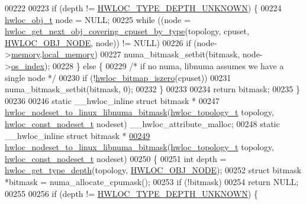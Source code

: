 \begin{DoxyCode}
00222 
00223   \textcolor{keywordflow}{if} (depth != \hyperlink{a00046_ggaf4e663cf42bbe20756b849c6293ef575a0565ab92ab72cb0cec91e23003294aad}{HWLOC_TYPE_DEPTH_UNKNOWN}) \{
00224     \hyperlink{a00016}{hwloc_obj_t} node = NULL;
00225     \textcolor{keywordflow}{while} ((node = \hyperlink{a00056_ga5915ea30f326676b3a4cfff371ce04d1}{hwloc_get_next_obj_covering_cpuset_by_type}(topology, cpuset, 
      \hyperlink{a00041_ggacd37bb612667dc437d66bfb175a8dc55aaf0964881117bdedf1a5e9332cd120dd}{HWLOC_OBJ_NODE}, node)) != NULL)
00226       \textcolor{keywordflow}{if} (node->\hyperlink{a00016_a1dc830816716213b5f797e4052487864}{memory}.\hyperlink{a00020_aace044c7f3fd9dffe50202296bf1dc5a}{local_memory})
00227         numa\_bitmask\_setbit(bitmask, node->\hyperlink{a00016_a61a7a80a68eaccbaaa28269e678c81a9}{os_index});
00228   \} \textcolor{keywordflow}{else} \{
00229     \textcolor{comment}{/* if no numa, libnuma assumes we have a single node */}
00230     \textcolor{keywordflow}{if} (!\hyperlink{a00065_gaa94fed35d2a598bc4a8657b6955b7bf5}{hwloc_bitmap_iszero}(cpuset))
00231       numa\_bitmask\_setbit(bitmask, 0);
00232   \}
00233 
00234   \textcolor{keywordflow}{return} bitmask;
00235 \}
00236 
00246 \textcolor{keyword}{static} \_\_hwloc\_inline \textcolor{keyword}{struct }bitmask *
00247 \hyperlink{a00069_gab67a395c48ddb56307b1465fab9bb9e6}{hwloc_nodeset_to_linux_libnuma_bitmask}(\hyperlink{a00039_ga9d1e76ee15a7dee158b786c30b6a6e38}{hwloc_topology_t} topology, 
      \hyperlink{a00040_ga2f5276235841ad66a79bedad16a5a10c}{hwloc_const_nodeset_t} nodeset) \_\_hwloc\_attribute\_malloc;
00248 \textcolor{keyword}{static} \_\_hwloc\_inline \textcolor{keyword}{struct }bitmask *
\hypertarget{a00034_source_l00249}{}\hyperlink{a00069_gab67a395c48ddb56307b1465fab9bb9e6}{00249} \hyperlink{a00069_gab67a395c48ddb56307b1465fab9bb9e6}{hwloc_nodeset_to_linux_libnuma_bitmask}(\hyperlink{a00039_ga9d1e76ee15a7dee158b786c30b6a6e38}{hwloc_topology_t} topology, 
      \hyperlink{a00040_ga2f5276235841ad66a79bedad16a5a10c}{hwloc_const_nodeset_t} nodeset)
00250 \{
00251   \textcolor{keywordtype}{int} depth = \hyperlink{a00046_gaea7c64dd59467f5201ba87712710b14d}{hwloc_get_type_depth}(topology, \hyperlink{a00041_ggacd37bb612667dc437d66bfb175a8dc55aaf0964881117bdedf1a5e9332cd120dd}{HWLOC_OBJ_NODE});
00252   \textcolor{keyword}{struct }bitmask *bitmask = numa\_allocate\_cpumask();
00253   \textcolor{keywordflow}{if} (!bitmask)
00254     \textcolor{keywordflow}{return} NULL;
00255 
00256   \textcolor{keywordflow}{if} (depth != \hyperlink{a00046_ggaf4e663cf42bbe20756b849c6293ef575a0565ab92ab72cb0cec91e23003294aad}{HWLOC_TYPE_DEPTH_UNKNOWN}) \{

\end{DoxyCode}
